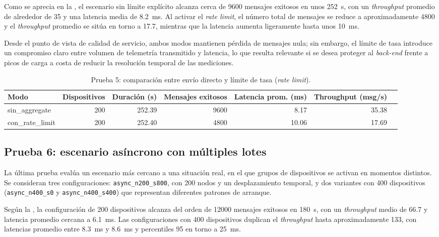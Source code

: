 Como se aprecia en la , el escenario sin l\'imite expl\'icito alcanza cerca de \num{9600} mensajes exitosos en unos \num{252}~\si{\second}, con un \emph{throughput} promedio de alrededor de \SI{35}{} y una latencia media de \SI{8.2}{\milli\second}. Al activar el \emph{rate limit}, el n\'umero total de mensajes se reduce a aproximadamente \num{4800} y el \emph{throughput} promedio se sit\'ua en torno a \SI{17.7}{}, mientras que la latencia aumenta ligeramente hasta unos \SI{10}{\milli\second}.

Desde el punto de vista de calidad de servicio, ambos modos mantienen p\'erdida de mensajes nula; sin embargo, el l\'imite de tasa introduce un compromiso claro entre volumen de telemetr\'ia transmitido y latencia, lo que resulta relevante si se desea proteger al \emph{back-end} frente a picos de carga a costa de reducir la resoluci\'on temporal de las mediciones.

\begin{table}[!t]
\centering
\caption{Prueba 5: comparaci\'on entre env\'io directo y l\'imite de tasa (\textit{rate limit}).}
\label{tab:prueba5}
\begin{tabular}{@{}lrrrrrr@{}}
\toprule
Modo & Dispositivos & Duraci\'on (s) & Mensajes exitosos & Latencia prom. (ms) & Throughput (msg/s) \\
\midrule
sin\_aggregate  & 200 & 252.39 & 9600 &  8.17 & 35.38 \\
con\_rate\_limit & 200 & 252.40 & 4800 & 10.06 & 17.69 \\
\bottomrule
\end{tabular}
\end{table}

\subsection{Prueba 6: escenario as\'incrono con m\'ultiples lotes}
La \'ultima prueba eval\'ua un escenario m\'as cercano a una situaci\'on real, en el que grupos de dispositivos se activan en momentos distintos. Se consideran tres configuraciones: \texttt{async\_n200\_s800}, con \num{200} nodos y un desplazamiento temporal, y dos variantes con \num{400} dispositivos (\texttt{async\_n400\_s0} y \texttt{async\_n400\_s400}) que representan diferentes patrones de arranque.

Seg\'un la , la configuraci\'on de \num{200} dispositivos alcanza del orden de \num{12000} mensajes exitosos en \num{180}~\si{\second}, con un \emph{throughput} medio de \SI{66.7}{} y latencia promedio cercana a \SI{6.1}{\milli\second}. Las configuraciones con \num{400} dispositivos duplican el \emph{throughput} hasta aproximadamente \SI{133}{}, con latencias promedio entre \SI{8.3}{\milli\second} y \SI{8.6}{\milli\second} y percentiles 95 en torno a \SI{25}{\milli\second}.


